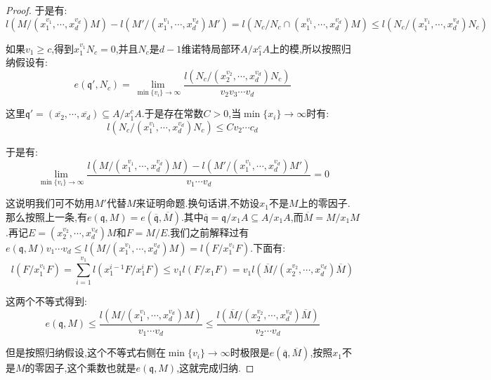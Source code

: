 \begin{enumerate}
\begin{proof}
		于是有:
		$$l(M/(x_1^{v_1},\cdots,x_d^{v_d})M)-l(M'/(x_1^{v_1},\cdots,x_d^{v_d})M')=l(N_c/N_c\cap(x_1^{v_1},\cdots,x_d^{v_d})M)\le l(N_c/(x_1^{v_1},\cdots,x_d^{v_d})N_c)$$
		
		如果$v_1\ge c$,得到$x_1^{v_1}N_c=0$,并且$N_c$是$d-1$维诺特局部环$A/x_1^cA$上的模,所以按照归纳假设有:
		$$e(\mathfrak{q}',N_c)=\lim\limits_{\min\{v_i\}\to\infty}\frac{l(N_c/(x_2^{v_2},\cdots,x_d^{v_d})N_c)}{v_2v_3\cdots v_d}$$
		
		这里$\mathfrak{q}'=(\overline{x_2},\cdots,\overline{x_d})\subseteq A/x_1^cA$.于是存在常数$C>0$,当$\min\{x_i\}\to\infty$时有:
		$$l(N_c/(x_1^{v_1},\cdots,x_d^{v_d})N_c)\le Cv_2\cdots c_d$$
		
		于是有:
		$$\lim\limits_{\min\{v_i\}\to\infty}\frac{l(M/(x_1^{v_1},\cdots,x_d^{v_d})M)-l(M'/(x_1^{v_1},\cdots,x_d^{v_d})M')}{v_1\cdots v_d}=0$$
		
		这说明我们可不妨用$M'$代替$M$来证明命题.换句话讲,不妨设$x_1$不是$M$上的零因子.那么按照上一条,有$e(\mathfrak{q},M)=e(\overline{\mathfrak{q}},\overline{M})$.其中$\overline{\mathfrak{q}}=\mathfrak{q}/x_1A\subseteq A/x_1A$,而$\overline{M}=M/x_1M$.再记$E=(x_2^{v_2},\cdots,x_d^{v_d})M$和$F=M/E$.我们之前解释过有$e(\mathfrak{q},M)v_1\cdots v_d\le l(M/(x_1^{v_1},\cdots,x_d^{v_d})M)=l(F/x_1^{v_1}F)$.下面有:
		$$l(F/x_1^{v_1}F)=\sum_{i=1}^{v_1}l(x_1^{i-1}F/x_1^iF)\le v_1l(F/x_1F)=v_1l(\overline{M}/(x_2^{v_2},\cdots,x_d^{v_d})\overline{M})$$
		
		这两个不等式得到:
		$$e(\mathfrak{q},M)\le\frac{l(M/(x_1^{v_1},\cdots,x_d^{v_d})M)}{v_1\cdots v_d}\le\frac{l(\overline{M}/(x_2^{v_2},\cdots,x_d^{v_d})\overline{M})}{v_2\cdots v_d}$$
		
		但是按照归纳假设,这个不等式右侧在$\min\{v_i\}\to\infty$时极限是$e(\overline{\mathfrak{q}},\overline{M})$,按照$x_1$不是$M$的零因子,这个乘数也就是$e(\mathfrak{q},M)$,这就完成归纳.
	\end{proof}
\end{enumerate}

